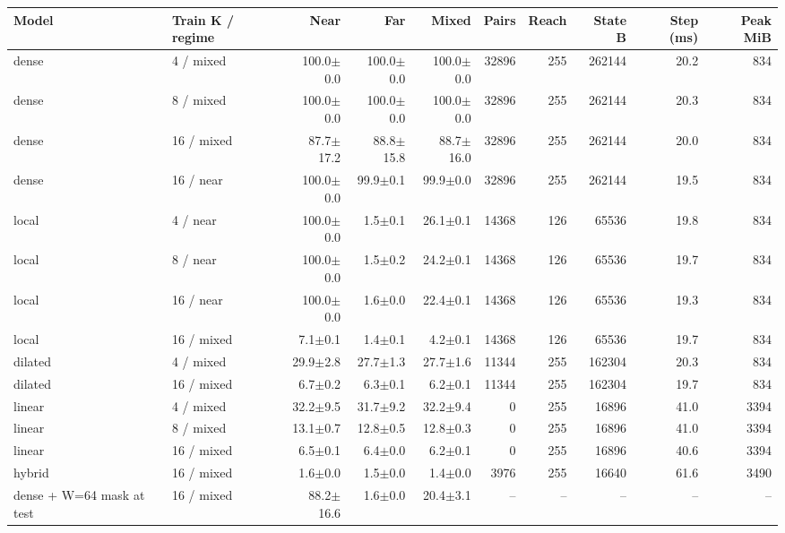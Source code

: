 \scriptsize
\setlength{\tabcolsep}{3.5pt}
\label{tab:t2bmain}
\begin{adjustbox}{max width=\linewidth}
\begin{tabular}{llrrrrrrrr}
\toprule
Model & Train K / regime & Near & Far & Mixed & Pairs & Reach & State B & Step (ms) & Peak MiB \\
\midrule
dense & 4 / mixed & 100.0$\pm$0.0 & 100.0$\pm$0.0 & 100.0$\pm$0.0 & 32896 & 255 & 262144 & 20.2 & 834 \\
dense & 8 / mixed & 100.0$\pm$0.0 & 100.0$\pm$0.0 & 100.0$\pm$0.0 & 32896 & 255 & 262144 & 20.3 & 834 \\
dense & 16 / mixed & 87.7$\pm$17.2 & 88.8$\pm$15.8 & 88.7$\pm$16.0 & 32896 & 255 & 262144 & 20.0 & 834 \\
dense & 16 / near & 100.0$\pm$0.0 & 99.9$\pm$0.1 & 99.9$\pm$0.0 & 32896 & 255 & 262144 & 19.5 & 834 \\
local & 4 / near & 100.0$\pm$0.0 & 1.5$\pm$0.1 & 26.1$\pm$0.1 & 14368 & 126 & 65536 & 19.8 & 834 \\
local & 8 / near & 100.0$\pm$0.0 & 1.5$\pm$0.2 & 24.2$\pm$0.1 & 14368 & 126 & 65536 & 19.7 & 834 \\
local & 16 / near & 100.0$\pm$0.0 & 1.6$\pm$0.0 & 22.4$\pm$0.1 & 14368 & 126 & 65536 & 19.3 & 834 \\
local & 16 / mixed & 7.1$\pm$0.1 & 1.4$\pm$0.1 & 4.2$\pm$0.1 & 14368 & 126 & 65536 & 19.7 & 834 \\
dilated & 4 / mixed & 29.9$\pm$2.8 & 27.7$\pm$1.3 & 27.7$\pm$1.6 & 11344 & 255 & 162304 & 20.3 & 834 \\
dilated & 16 / mixed & 6.7$\pm$0.2 & 6.3$\pm$0.1 & 6.2$\pm$0.1 & 11344 & 255 & 162304 & 19.7 & 834 \\
linear & 4 / mixed & 32.2$\pm$9.5 & 31.7$\pm$9.2 & 32.2$\pm$9.4 & 0 & 255 & 16896 & 41.0 & 3394 \\
linear & 8 / mixed & 13.1$\pm$0.7 & 12.8$\pm$0.5 & 12.8$\pm$0.3 & 0 & 255 & 16896 & 41.0 & 3394 \\
linear & 16 / mixed & 6.5$\pm$0.1 & 6.4$\pm$0.0 & 6.2$\pm$0.1 & 0 & 255 & 16896 & 40.6 & 3394 \\
hybrid & 16 / mixed & 1.6$\pm$0.0 & 1.5$\pm$0.0 & 1.4$\pm$0.0 & 3976 & 255 & 16640 & 61.6 & 3490 \\
\midrule
dense + W=64 mask at test & 16 / mixed & 88.2$\pm$16.6 & 1.6$\pm$0.0 & 20.4$\pm$3.1 & -- & -- & -- & -- & -- \\
\bottomrule
\end{tabular}
\end{adjustbox}
